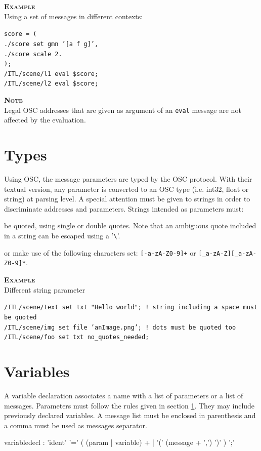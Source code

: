 \documentclass[a4paper,twoside]{report}
\newcommand{\sublevel}[1]	{\section{#1}}
\newcommand{\OSC}[1]		{\texttt{#1}}
\newcommand{\example}		{\textbf{\hspace{-1.5cm}\textbf{\textsc{Example }}}}
\newcommand{\note}	[1]		{\vspace{2mm}\textbf{\hspace{-1.03cm}\textbf{\textsc{Note #1}}}}
\let\olditemize\itemize
\let\oldenditemize\enditemize
\renewenvironment{itemize} 	{\olditemize \setlength{\itemsep}{1mm}}{\oldenditemize}
\newcommand{\sample}	[1]			{\vspace{-2mm}\begin{center}\colorbox{mygrey}{
								\begin{minipage}[t]{0.9\columnwidth} 
								{\small \texttt{#1}}
								\end{minipage}}\end{center}}
\begin{document}
\example\\
Using a set of messages in different contexts:
\sample{score = (\\
\hspace*{5mm}./score set gmn '[a f g]', \\
\hspace*{5mm}./score scale 2.\\
);\\
/ITL/scene/l1 eval \$score;\\
/ITL/scene/l2 eval \$score;
}

\note{}\\
Legal OSC addresses that are given as argument of an \OSC{eval} message are not affected by the evaluation.


\sublevel{Types}\label{scripttypes}

Using OSC, the message parameters are typed by the OSC protocol. 
With their textual version, any parameter is converted to an OSC type (i.e. int32, float or string) at parsing level.
A special attention must be given to strings in order to discriminate addresses and parameters. Strings intended as parameters must:
\begin{itemize}
\item be quoted, using single or double quotes. Note that an ambiguous quote included in a string can be escaped using a '\verb+\+'.
\item or make use of the following characters set: \OSC{[-a-zA-Z0-9]+} or \OSC{[\_a-zA-Z][\_a-zA-Z0-9]*}.
 \end{itemize}

\example \\
Different string parameter
\sample{/ITL/scene/text set txt "Hello world";  ! string including a space must be quoted \\
/ITL/scene/img set file 'anImage.png';  ! dots must be quoted too \\
/ITL/scene/foo set txt no\_quotes\_needed;
}


\sublevel{Variables}\label{scriptvar}

A variable declaration associates a name with a list of parameters or a list of messages.
Parameters must follow the rules given in section \ref{scripttypes}. They may include previously declared variables. A message list must be enclosed in parenthesis and a comma must be used as messages separator.
\begin{rail} 
variabledecl : 'ident' '=' ( (param | variable) +
					| '(' (message + ',') ')' ) ';'
\end{rail}
\end{document}
